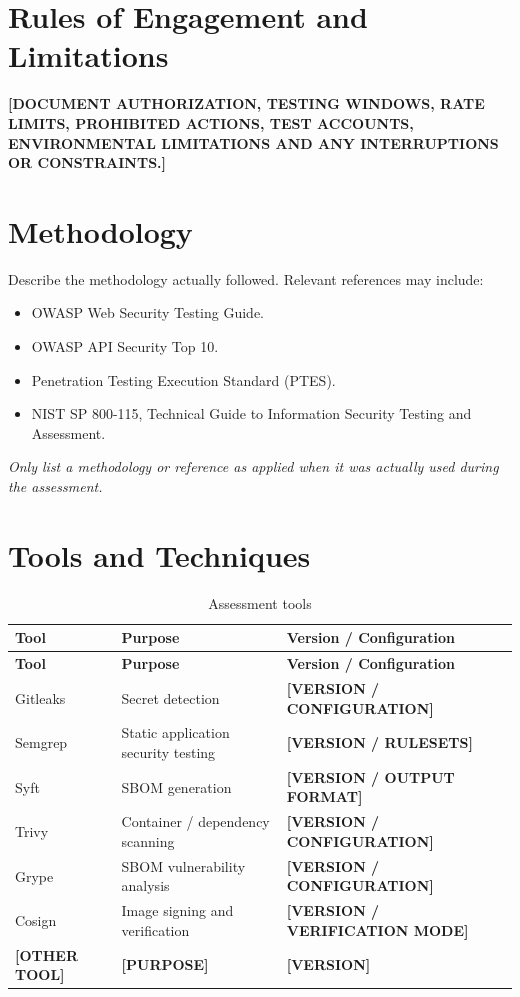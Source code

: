 \documentclass[11pt,a4paper]{report}
\newcommand{\placeholder}[1]{\textbf{[#1]}}
\begin{document}
\section{Rules of Engagement and Limitations}
\placeholder{DOCUMENT AUTHORIZATION, TESTING WINDOWS, RATE LIMITS,
PROHIBITED ACTIONS, TEST ACCOUNTS, ENVIRONMENTAL LIMITATIONS AND ANY
INTERRUPTIONS OR CONSTRAINTS.}

\section{Methodology}
Describe the methodology actually followed. Relevant references may include:
\begin{itemize}
    \item OWASP Web Security Testing Guide.
    \item OWASP API Security Top 10.
    \item Penetration Testing Execution Standard (PTES).
    \item NIST SP 800-115, Technical Guide to Information Security Testing
          and Assessment.
\end{itemize}
\textit{Only list a methodology or reference as applied when it was actually
used during the assessment.}

\section{Tools and Techniques}
\begin{longtable}{@{}p{35mm}p{38mm}p{75mm}@{}}
    \caption{Assessment tools}\\
    \toprule
    \textbf{Tool} & \textbf{Purpose} & \textbf{Version / Configuration} \\
    \midrule
    \endfirsthead
    \toprule
    \textbf{Tool} & \textbf{Purpose} & \textbf{Version / Configuration} \\
    \midrule
    \endhead
    Gitleaks & Secret detection & \placeholder{VERSION / CONFIGURATION} \\
    Semgrep & Static application security testing & \placeholder{VERSION / RULESETS} \\
    Syft & SBOM generation & \placeholder{VERSION / OUTPUT FORMAT} \\
    Trivy & Container / dependency scanning & \placeholder{VERSION / CONFIGURATION} \\
    Grype & SBOM vulnerability analysis & \placeholder{VERSION / CONFIGURATION} \\
    Cosign & Image signing and verification & \placeholder{VERSION / VERIFICATION MODE} \\
    \placeholder{OTHER TOOL} & \placeholder{PURPOSE} & \placeholder{VERSION} \\
    \bottomrule
\end{longtable}
\end{document}

